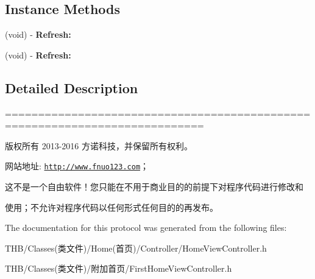 \subsection*{Instance Methods}
\begin{DoxyCompactItemize}
\item 
\mbox{\label{protocol_home_view_controller_refresh_delegate_01-p_afe9152115b2cfe3e622d7d398d708b07}} 
(void) -\/ {\bfseries Refresh\+:}
\item 
\mbox{\label{protocol_home_view_controller_refresh_delegate_01-p_afe9152115b2cfe3e622d7d398d708b07}} 
(void) -\/ {\bfseries Refresh\+:}
\end{DoxyCompactItemize}


\subsection{Detailed Description}
============================================================================

版权所有 2013-\/2016 方诺科技，并保留所有权利。

网站地址\+: \href{http://www.fnuo123.com}{\tt http\+://www.\+fnuo123.\+com}； 



这不是一个自由软件！您只能在不用于商业目的的前提下对程序代码进行修改和

使用；不允许对程序代码以任何形式任何目的的再发布。 

 

The documentation for this protocol was generated from the following files\+:\begin{DoxyCompactItemize}
\item 
T\+H\+B/\+Classes(类文件)/\+Home(首页)/\+Controller/Home\+View\+Controller.\+h\item 
T\+H\+B/\+Classes(类文件)/附加首页/First\+Home\+View\+Controller.\+h\end{DoxyCompactItemize}
